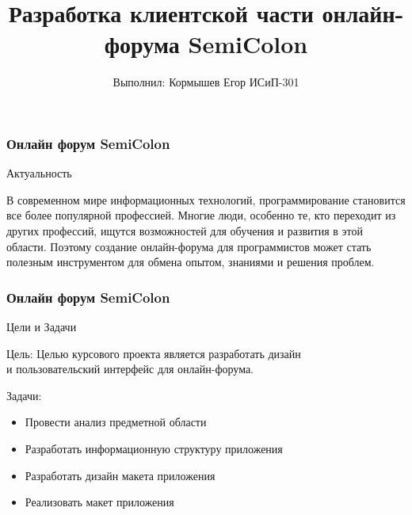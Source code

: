 \documentclass[aspectratio=169]{beamer}
\title{Разработка клиентской части онлайн-форума SemiColon}
\author{Выполнил: Кормышев Егор ИСиП-301}
\begin{document}
\frame{\titlepage}


\begin{frame}
  \frametitle{Онлайн форум SemiColon}
  
  \begin{center}
    \huge{Актуальность}
  \end{center}
  
  \begin{center}
    В современном мире информационных технологий, программирование становится все более популярной профессией. Многие люди, особенно те, кто переходит из других профессий, ищутся возможностей для обучения и развития в этой области. Поэтому создание онлайн-форума для программистов может стать полезным инструментом для обмена опытом, знаниями и решения проблем.

  \end{center}

\end{frame}

\begin{frame}
  \frametitle{Онлайн форум SemiColon}

  
  \begin{center}
    \huge{Цели и Задачи}
  \end{center}
  
  \large{Цель:}
  Целью курсового проекта является разработать дизайн \\ и пользовательский интерфейс для онлайн-форума. \\
  \bigskip

  \large{Задачи:}    
  \begin{itemize}
  \item Провести анализ предметной области
  \item Разработать информационную структуру приложения
  \item Разработать дизайн макета приложения
  \item Реализовать макет приложения
  \end{itemize}
  
\end{frame}
\end{document}
